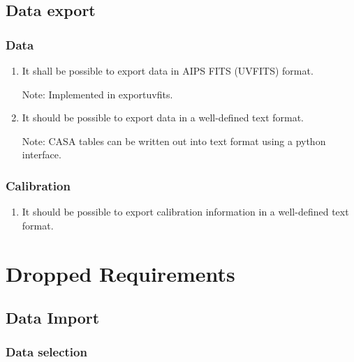 \documentclass[11pt,a4paper]{article}
\begin{document}
\subsection{Data export}

\subsubsection{Data}

\begin{enumerate}[subsubseclist]

\item It shall be possible to export data in AIPS FITS (UVFITS) format.

  Note: Implemented in exportuvfits.
  
\item It should be possible to export data in a well-defined text format.

  Note: CASA tables can be written out into text format using a python
  interface.
  
\end{enumerate}

\subsubsection{Calibration}

\begin{enumerate}[subsubseclist]
  
\item It should be possible to export calibration information in a
  well-defined text format.

\end{enumerate}


\section{Dropped Requirements}

\subsection{Data Import}

\subsubsection{Data selection}
\end{document}
